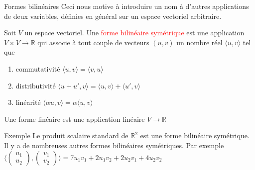         \begin{parag}{Formes bilinéaires}
            Ceci nous motive à introduire un nom à d'autres applications de deux variables, définies en général sur un espace vectoriel arbitraire.
            \begin{definition}
                Soit $V$ un espace vectoriel. Une \textcolor{red}{forme bilinéaire symétrique} est une application $V \times V \to \mathbb{R}$ qui associe à tout couple de vecteurs $(u, v)$ un nombre réel $\langle u, v \rangle$ tel que
                \begin{enumerate}
                    \item commutativité $\langle u, v \rangle = \langle v, u \rangle$
                    \item distributivité $\langle u + u', v \rangle = \langle u, v \rangle + \langle u' , v \rangle$
                    \item linéarité $\langle \alpha u, v \rangle = \alpha \langle u, v \rangle$
                \end{enumerate}
                \begin{framedremark}
                    Une forme linéaire est une application linéaire $V \to \mathbb{R}$
                \end{framedremark}
            \end{definition}
            \begin{subparag}{Exemple}
                Le produit scalaire standard de $\mathbb{R}^2$ est une forme bilinéaire symétrique.
                \\
                Il y a de nombreuses autres formes bilinéaires symétriques. Par exemple $\langle \begin{pmatrix}
                    u_1 \\ u_2
                \end{pmatrix}, \begin{pmatrix}
                    v_1 \\ v_2
                \end{pmatrix}\rangle = 7u_1v_1 + 2u_1v_2 + 2u_2v_1 + 4u_2v_2$
            \end{subparag}
        
        \end{parag}

